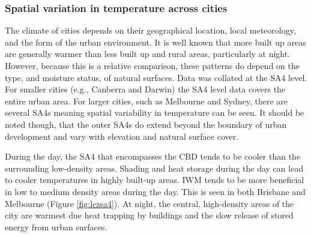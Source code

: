 \documentclass[utf8]{frontiersSCNS} %
\begin{document}
\subsubsection{Spatial variation in temperature across cities}\label{sec:results1a}

The climate of cities depends on their geographical location, local meteorology, and the form of the urban environment. It is well known that more built up areas are generally warmer than less built up and rural areas, particularly at night. However, because this is a relative comparison, these patterns do depend on the type, and moisture status, of natural surfaces. Data was collated at the SA4 level. For smaller cities (e.g., Canberra and Darwin) the SA4 level data covers the entire urban area. For larger cities, such as Melbourne and Sydney, there are several SA4s meaning spatial variability in temperature can be seen. It should be noted though, that the outer SA4s do extend beyond the boundary of urban development and vary with elevation and natural surface cover.

During the day, the SA4 that encompasses the CBD tends to be cooler than the surrounding low-density areas. Shading and heat storage during the day can lead to cooler temperatures in highly built-up areas. IWM tends to be more beneficial in low to medium density areas during the day. This is seen in both Brisbane and Melbourne (Figure \ref{fig:lczsa4}). At night, the central, high-density areas of the city are warmest due heat trapping by buildings and the slow release of stored energy from urban surfaces. 
\end{document}
